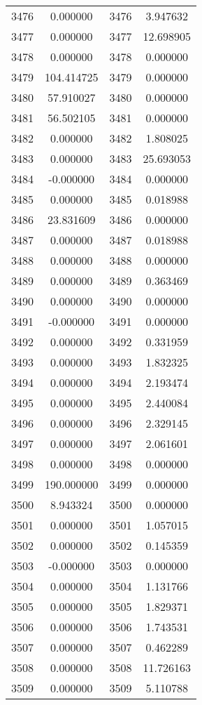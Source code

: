 \documentclass[12pt]{article}
\begin{document}
\begin{longtable}{@{}cccc@{}}
3476 & 0.000000 & 3476 & 3.947632 \\
3477 & 0.000000 & 3477 & 12.698905 \\
3478 & 0.000000 & 3478 & 0.000000 \\
3479 & 104.414725 & 3479 & 0.000000 \\
3480 & 57.910027 & 3480 & 0.000000 \\
3481 & 56.502105 & 3481 & 0.000000 \\
3482 & 0.000000 & 3482 & 1.808025 \\
3483 & 0.000000 & 3483 & 25.693053 \\
3484 & -0.000000 & 3484 & 0.000000 \\
3485 & 0.000000 & 3485 & 0.018988 \\
3486 & 23.831609 & 3486 & 0.000000 \\
3487 & 0.000000 & 3487 & 0.018988 \\
3488 & 0.000000 & 3488 & 0.000000 \\
3489 & 0.000000 & 3489 & 0.363469 \\
3490 & 0.000000 & 3490 & 0.000000 \\
3491 & -0.000000 & 3491 & 0.000000 \\
3492 & 0.000000 & 3492 & 0.331959 \\
3493 & 0.000000 & 3493 & 1.832325 \\
3494 & 0.000000 & 3494 & 2.193474 \\
3495 & 0.000000 & 3495 & 2.440084 \\
3496 & 0.000000 & 3496 & 2.329145 \\
3497 & 0.000000 & 3497 & 2.061601 \\
3498 & 0.000000 & 3498 & 0.000000 \\
3499 & 190.000000 & 3499 & 0.000000 \\
3500 & 8.943324 & 3500 & 0.000000 \\
3501 & 0.000000 & 3501 & 1.057015 \\
3502 & 0.000000 & 3502 & 0.145359 \\
3503 & -0.000000 & 3503 & 0.000000 \\
3504 & 0.000000 & 3504 & 1.131766 \\
3505 & 0.000000 & 3505 & 1.829371 \\
3506 & 0.000000 & 3506 & 1.743531 \\
3507 & 0.000000 & 3507 & 0.462289 \\
3508 & 0.000000 & 3508 & 11.726163 \\
3509 & 0.000000 & 3509 & 5.110788 \\

\end{longtable}
\end{document}
